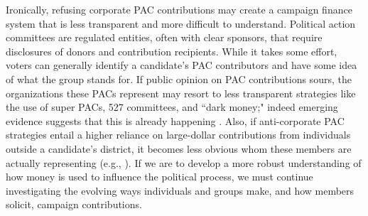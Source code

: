 \documentclass[12pt]{article}
\begin{document}
Ironically, refusing corporate PAC contributions may create a campaign finance system that is less transparent and more difficult to understand. Political action committees are regulated entities, often with clear sponsors, that require disclosures of donors and contribution recipients. While it takes some effort, voters can generally identify a candidate's PAC contributors and have some idea of what the group stands for. If public opinion on PAC contributions sours, the organizations these PACs represent may resort to less transparent strategies like the use of super PACs, 527 committees, and ``dark money;" indeed emerging evidence suggests that this is already happening \citep{opensecrets.org2019, massoglia2021}. Also, if anti-corporate PAC strategies entail a higher reliance on large-dollar contributions from individuals outside a candidate's district, it becomes less obvious whom these members are actually representing (e.g., \citet{baker2016}). If we are to develop a more robust understanding of how money is used to influence the political process, we must continue investigating the evolving ways individuals and groups make, and how members solicit, campaign contributions. 

\singlespacing
{}
%
\printbibliography
\pagebreak
\end{document}

